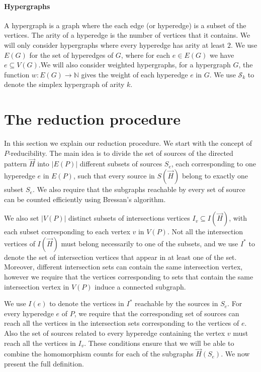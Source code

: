 \documentclass[a4paper,UKenglish,cleveref, autoref, numberwithinsect, thm-restate]{lipics-v2021}
\newcommand{\simplex}[1]{\cS_{#1}}
\newcommand{\cS}{\mathcal{S}}
\newcommand{\NN}{\mathbb{N}}
\begin{document}
	\paragraph*{Hypergraphs}
	
	A hypergraph is a graph where the each edge (or hyperedge) is a subset of the vertices. The arity of a hyperedge is the number of vertices that it contains. We will only consider hypergraphs where every hyperedge has arity at least $2$. We use $E(G)$ for the set of hyperedges of $G$, where for each $e \in E(G)$ we have $e \subseteq V(G)$.We will also consider weighted hypergraphs, for a hypergraph $G$, the function $w: E(G) \to \NN$ gives the weight of each hyperedge $e$ in $G$. We use $\simplex{k}$ to denote the simplex hypergraph of arity $k$.
	
	\section{The reduction procedure} \label{sec:reduce}
	
	In this section we explain our reduction procedure. We start with the concept of $P$-reducibility. The main idea is to divide the set of sources of the directed pattern $\vec{H}$ into $|E(P)|$ different subsets of sources $S_e$, each corresponding to one hyperedge $e$ in $E(P)$, such that every source in $S(\vec{H})$ belong to exactly one subset $S_e$. We also require that the subgraphs reachable by every set of source can be counted efficiently using Bressan's algorithm.
	
	We also set $|V(P)|$ distinct subsets of intersections vertices $I_v \subseteq I(\vec{H})$, with each subset corresponding to each vertex $v$ in $V(P)$. Not all the intersection vertices of $I(\vec{H})$ must belong necessarily to one of the subsets, and we use $I^*$ to denote the set of intersection vertices that appear in at least one of the set. Moreover, different intersection sets can contain the same intersection vertex, however we require that the vertices corresponding to sets that contain the same intersection vertex in $V(P)$ induce a connected subgraph.
	
	We use $I(e)$ to denote the vertices in $I^*$ reachable by the sources in $S_e$. For every hyperedge $e$ of $P$, we require that the corresponding set of sources can reach all the vertices in the intersection sets corresponding to the vertices of $e$. Also the set of sources related to every hyperedge containing the vertex $v$ must reach all the vertices in $I_v$. These conditions ensure that we will be able to combine the homomorphism counts for each of the subgraphs $\vec{H}(S_e)$. We now present the full definition.
	
\end{document}
